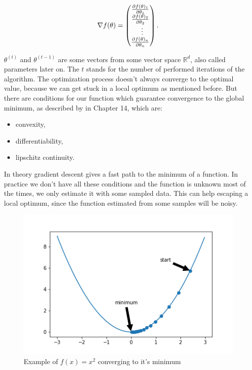 \documentclass[aodsor,preprint]{imsart}
\numberwithin{equation}{section}
\theoremstyle{plain}
\begin{document}
\begin{equation}
\nabla f(\theta) = \begin{pmatrix}
\frac{\partial f(\theta)_{1}}{\partial \theta_{1}} \\
\frac{\partial f(\theta)_{2}}{\partial \theta_{2}} \\
\;\;\vdots \notag \\
\frac{\partial f(\theta)_{n}}{\partial \theta_{n}} \\
\end{pmatrix}.
\label{eq:gradient}
\end{equation}

$\theta^{(t)}$ and $\theta^{(t-1)}$ are some vectors from some vector space $\mathbb{R}^d$, also called parameters later on. The $t$ stands for the number of performed iterations of the algorithm. The optimization process doesn't always converge to the optimal value, because we can get stuck in a local optimum as mentioned before. But there are conditions for our function which guarantee convergence to the global minimum, as described by \cite{shalev} in Chapter 14, which are: 

\begin{center}
\begin{itemize}
\item convexity,
\item differentiability,
\item lipschitz continuity.
\end{itemize}
\end{center}

In theory gradient descent gives a fast path to the minimum of a function. In practice we don't have all these conditions and the function is unknown most of the times, we only estimate it with some sampled data. This can help escaping a local optimum, since the function estimated from some samples will be noisy.

\begin{figure}[htb]
\centering
\includegraphics[width=\textwidth]{images/gd_ex1.png}
\caption{Example of $f(x) = x^2$ converging to it's minimum}
\label{fig:gdex1}
\end{figure}
\end{document}
